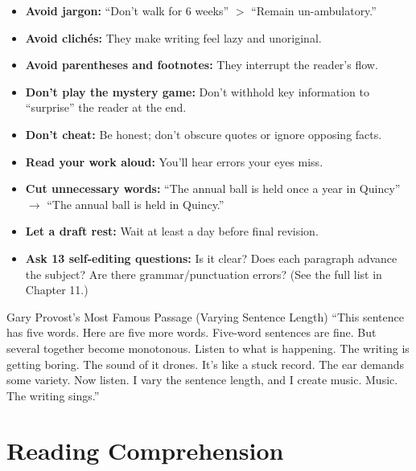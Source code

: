 \documentclass[12pt,a4paper]{article}
\begin{document}
\begin{itemize}[noitemsep]
    \item \textbf{Avoid jargon:} ``Don't walk for 6 weeks'' $>$ ``Remain un-ambulatory.''
    \item \textbf{Avoid clich\'{e}s:} They make writing feel lazy and unoriginal.
    \item \textbf{Avoid parentheses and footnotes:} They interrupt the reader's flow.
    \item \textbf{Don't play the mystery game:} Don't withhold key information to ``surprise'' the reader at the end.
    \item \textbf{Don't cheat:} Be honest; don't obscure quotes or ignore opposing facts.
    \item \textbf{Read your work aloud:} You'll hear errors your eyes miss.
    \item \textbf{Cut unnecessary words:} ``The annual ball is held once a year in Quincy'' $\rightarrow$ ``The annual ball is held in Quincy.''
    \item \textbf{Let a draft rest:} Wait at least a day before final revision.
    \item \textbf{Ask 13 self-editing questions:} Is it clear? Does each paragraph advance the subject? Are there grammar/punctuation errors? (See the full list in Chapter 11.)
\end{itemize}

\begin{tipbox}{Gary Provost's Most Famous Passage (Varying Sentence Length)}
``This sentence has five words. Here are five more words. Five-word sentences are fine. But several together become monotonous. Listen to what is happening. The writing is getting boring. The sound of it drones. It's like a stuck record. The ear demands some variety. Now listen. I vary the sentence length, and I create music. Music. The writing sings.''
\end{tipbox}

\newpage

\section{Reading Comprehension}
\end{document}
